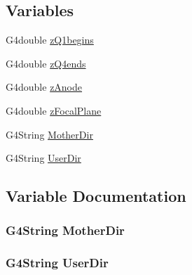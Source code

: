 \subsection*{Variables}
\begin{DoxyCompactItemize}
\item 
G4double \hyperlink{EMMADetectorConstruction_8hh_a63b4d37f848ab857400025988ebc68ac}{z\+Q1begins}
\item 
G4double \hyperlink{EMMADetectorConstruction_8hh_aaefdf69418ceee3aabc72a346eef1799}{z\+Q4ends}
\item 
G4double \hyperlink{EMMADetectorConstruction_8hh_a9906ccfd8985bb28a72c37e7cd16f277}{z\+Anode}
\item 
G4double \hyperlink{EMMADetectorConstruction_8hh_a499096b9dc56ffa559bd1aec0bafe28e}{z\+Focal\+Plane}
\item 
G4\+String \hyperlink{EMMADetectorConstruction_8hh_a28a3faf9b4768b420044f0d81fa645b7}{Mother\+Dir}
\item 
G4\+String \hyperlink{EMMADetectorConstruction_8hh_a8558631b93942e4ae79b3feb21c97c8f}{User\+Dir}
\end{DoxyCompactItemize}


\subsection{Variable Documentation}
\subsubsection[{\texorpdfstring{Mother\+Dir}{MotherDir}}]{\setlength{\rightskip}{0pt plus 5cm}G4\+String Mother\+Dir}\hypertarget{EMMADetectorConstruction_8hh_a28a3faf9b4768b420044f0d81fa645b7}{}\label{EMMADetectorConstruction_8hh_a28a3faf9b4768b420044f0d81fa645b7}
\subsubsection[{\texorpdfstring{User\+Dir}{UserDir}}]{\setlength{\rightskip}{0pt plus 5cm}G4\+String User\+Dir}\hypertarget{EMMADetectorConstruction_8hh_a8558631b93942e4ae79b3feb21c97c8f}{}\label{EMMADetectorConstruction_8hh_a8558631b93942e4ae79b3feb21c97c8f}
